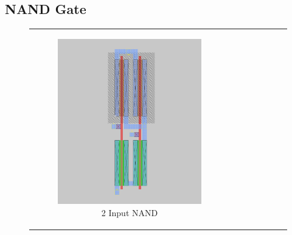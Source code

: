 \documentclass[conference]{IEEEtran}
\begin{document}
\subsection{NAND Gate}

\begin{figure}[H]
    \centering
    \begin{tabular}{cc}
        \begin{subfigure}{0.44\linewidth}
            \centering
            \includegraphics[width=\textwidth]{images/nand_cmos_layout.png}
            \caption{2 Input NAND}
        \end{subfigure} &
        \begin{subfigure}{0.44\linewidth}
            \centering

\end{subfigure}
\end{tabular}
\end{figure}
\end{document}
